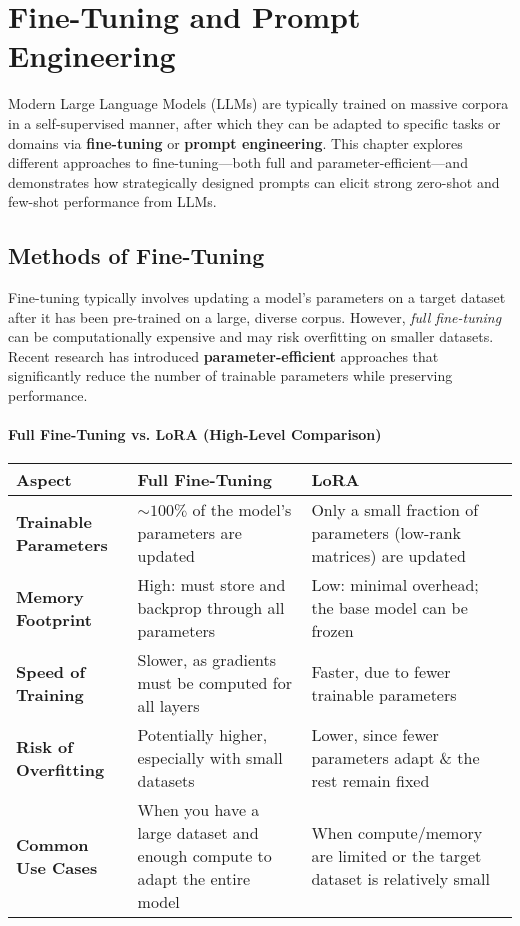 \chapter{Fine-Tuning and Prompt Engineering}
\label{chap:fine_tuning_prompt}

\noindent
Modern Large Language Models (LLMs) are typically trained on massive corpora in a self-supervised manner, after which they can be adapted to specific tasks or domains via \textbf{fine-tuning} or \textbf{prompt engineering}. This chapter explores different approaches to fine-tuning—both full and parameter-efficient—and demonstrates how strategically designed prompts can elicit strong zero-shot and few-shot performance from LLMs.

\section{Methods of Fine-Tuning}
\label{sec:methods_finetune}

\noindent
Fine-tuning typically involves updating a model’s parameters on a target dataset after it has been pre-trained on a large, diverse corpus. However, \emph{full fine-tuning} can be computationally expensive and may risk overfitting on smaller datasets. Recent research has introduced \textbf{parameter-efficient} approaches that significantly reduce the number of trainable parameters while preserving performance.

\subsubsection*{Full Fine-Tuning vs. LoRA (High-Level Comparison)}
\begin{center}
\renewcommand{\arraystretch}{1.3}
\begin{tabular}{p{} | p{} p{}}
\hline
\textbf{Aspect} & \textbf{Full Fine-Tuning} & \textbf{LoRA} \\ \hline
\textbf{Trainable Parameters} 
& \(\sim\!100\%\) of the model’s parameters are updated 
& Only a small fraction of parameters (low-rank matrices) are updated \\

\textbf{Memory Footprint} 
& High: must store and backprop through all parameters 
& Low: minimal overhead; the base model can be frozen \\

\textbf{Speed of Training} 
& Slower, as gradients must be computed for all layers 
& Faster, due to fewer trainable parameters \\

\textbf{Risk of Overfitting} 
& Potentially higher, especially with small datasets 
& Lower, since fewer parameters adapt \& the rest remain fixed \\

\textbf{Common Use Cases} 
& When you have a large dataset and enough compute to adapt the entire model 
& When compute/memory are limited or the target dataset is relatively small \\ \hline
\end{tabular}
\end{center}

